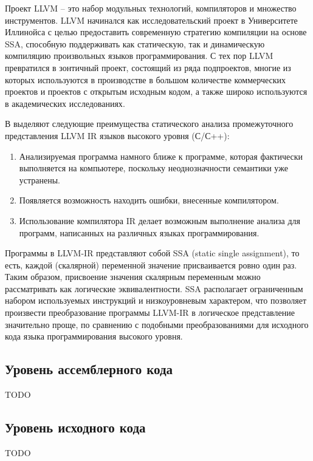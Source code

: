 Проект LLVM -- это набор модульных технологий, компиляторов и множество инструментов. LLVM начинался как исследовательский проект в Университете 
Иллинойса с целью предоставить современную стратегию компиляции на основе SSA, способную поддерживать как статическую, так и динамическую компиляцию 
произвольных языков программирования. С тех пор LLVM превратился в зонтичный проект, состоящий из ряда подпроектов, многие из которых используются в 
производстве в большом количестве коммерческих проектов и проектов с открытым исходным кодом, а также широко используются в академических 
исследованиях\cite{Chow2013IR}.

В \cite{10.1007/978-3-642-27705-4_12} выделяют следующие преимущества статического анализа промежуточного представления LLVM IR языков высокого уровня (С/С++):
\begin{enumerate}
    \item Анализируемая программа намного ближе к программе, которая фактически выполняется на компьютере, поскольку неоднозначности семантики уже 
          устранены. 
    \item Появляется возможность находить ошибки, внесенные компилятором.
    \item Использование компилятора IR делает возможным выполнение анализа для программ, написанных на различных языках программирования.
\end{enumerate}

Программы в LLVM-IR представляют собой SSA (static single assignment), то есть, каждой (скалярной) переменной значение присваивается ровно один раз.
Таким образом, присвоение значения скалярным переменным можно рассматривать как логические эквивалентности. SSA располагает ограниченным набором 
используемых инструкций и  низкоуровневым характером, что позволяет произвести преобразование программы LLVM-IR в логическое представление значительно 
проще, по сравнению с подобными преобразованиями для исходного кода языка программирования высокого уровня\cite{10.1007/978-3-642-27705-4_12}.


\subsection{Уровень ассемблерного кода}
TODO
        
\subsection{Уровень исходного кода}
TODO

